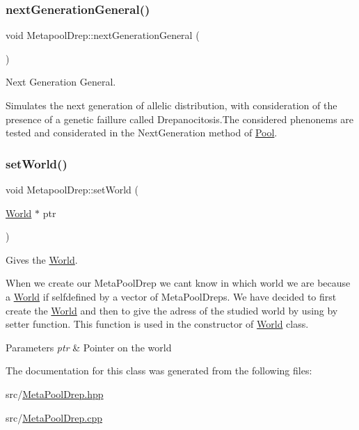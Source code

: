 \subsubsection{\texorpdfstring{next\+Generation\+General()}{nextGenerationGeneral()}}
{\footnotesize\ttfamily void Metapool\+Drep\+::next\+Generation\+General (\begin{DoxyParamCaption}{ }\end{DoxyParamCaption})}



Next Generation General. 

Simulates the next generation of allelic distribution, with consideration of the presence of a genetic faillure called Drepanocitosis.\+The considered phenonems are tested and considerated in the Next\+Generation method of \hyperlink{class_pool}{Pool}. \hypertarget{class_metapool_drep_a67b44295a95152c8c760b0bb6ca1c42b}{}\label{class_metapool_drep_a67b44295a95152c8c760b0bb6ca1c42b} 
\subsubsection{\texorpdfstring{set\+World()}{setWorld()}}
{\footnotesize\ttfamily void Metapool\+Drep\+::set\+World (\begin{DoxyParamCaption}\item[{\hyperlink{class_world}{World} $\ast$}]{ptr }\end{DoxyParamCaption})}



Gives the \hyperlink{class_world}{World}. 

When we create our Meta\+Pool\+Drep we can\textquotesingle{}t know in which world we are because a \hyperlink{class_world}{World} if selfdefined by a vector of Meta\+Pool\+Dreps. We have decided to first create the \hyperlink{class_world}{World} and then to give the adress of the studied world by using by setter function. This function is used in the constructor of \hyperlink{class_world}{World} class. 
\begin{DoxyParams}{Parameters}
{\em ptr} & Pointer on the world \\
\hline
\end{DoxyParams}


The documentation for this class was generated from the following files\+:\begin{DoxyCompactItemize}
\item 
src/\hyperlink{_meta_pool_drep_8hpp}{Meta\+Pool\+Drep.\+hpp}\item 
src/\hyperlink{_meta_pool_drep_8cpp}{Meta\+Pool\+Drep.\+cpp}\end{DoxyCompactItemize}
